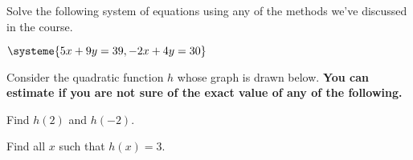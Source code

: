 \documentclass[11pt]{exam}
\begin{document}
\addpoints

\noindent
\begin{center}
\gradetable[v][pages]  %
\end{center}


\newpage %

%
%
%

\begin{questions}

\newpage
\addpoints

\question[4] Solve the following system of equations using any of the methods we've discussed in the course.
\begin{center}
$\systeme{5x+9y=39,-2x+4y=30}$
\end{center}
\newpage

\question[4] Consider the quadratic function $h$ whose graph is drawn below.  \textbf{You can estimate if you are not sure of the exact value of any of the following.}
\begin{multicols}{2}
\begin{center}
\end{center}
\begin{compactenum}[(a)]
\item Find $h(2)$ and $h(-2)$.
\vspace{1.5cm}

\item Find all $x$ such that $h(x)=3$.
\vspace{1.5cm}


\end{compactenum}
\end{multicols}
\end{questions}
\end{document}
